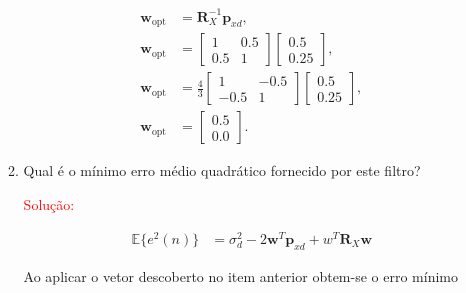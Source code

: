 \documentclass[a4paper,10pt]{article}
\begin{document}
\begin{enumerate}
\begin{enumerate}
						\begin{align}
							\mathbf{w}_{\text{opt}} &= \mathbf{R}^{-1}_{X} \mathbf{p}_{xd}, \\
							\mathbf{w}_{\text{opt}} &=  \left[ \begin{matrix} 1 & 0.5 \\ 0.5 & 1 \end{matrix} \right]  \left[ \begin{matrix} 0.5 \\ 0.25 \end{matrix} \right], \\
							\mathbf{w}_{\text{opt}} &=  \frac{4}{3} \left[ \begin{matrix} 1 & -0.5 \\ -0.5 & 1 \end{matrix} \right]  \left[ \begin{matrix} 0.5 \\ 0.25 \end{matrix} \right], \\
							\mathbf{w}_{\text{opt}} &= \left[ \begin{matrix} 0.5 \\ 0.0 \end{matrix} \right].
						\end{align}
					
					\item Qual é o mínimo erro médio quadrático fornecido por este filtro?
					
						\textcolor{red}{Solução:}
						
						\begin{align}
							\mathbb{E}\{e^{2}(n)\}  &=\sigma^{2}_{d} - 2\mathbf{w}^{T}\mathbf{p}_{xd} + w^{T}\mathbf{R}_{X}\mathbf{w}      
						\end{align}
						
						Ao aplicar o vetor descoberto no item anterior obtem-se o erro mínimo
						

\end{enumerate}
\end{enumerate}
\end{document}
